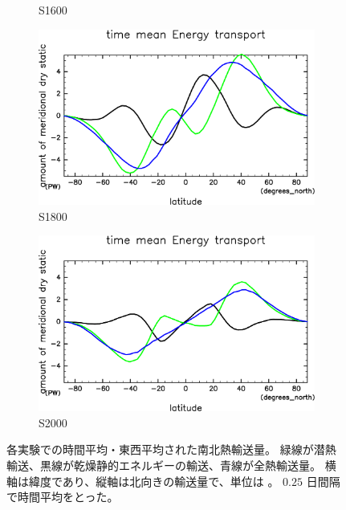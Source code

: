\documentclass[body]{subfiles}
\begin{document}
\begin{figure}[t]
\begin{subfigure}{.4\textwidth}
		\caption{S1600}\label{EnFlxS1600}
	\end{subfigure}
	\begin{subfigure}{.4\textwidth}
		\centering
		\includegraphics[width=\columnwidth]{S1800/EngyFlx,time=3650:4015-crop-rotate.pdf}
		\caption{S1800}\label{EnFlxS1800}
	\end{subfigure}
	\begin{subfigure}{.4\textwidth}
		\centering
		\includegraphics[width=\columnwidth]{S2000/EngyFlx,time=7300:7665-crop-rotate.pdf}
		\caption{S2000}\label{EnFlxS2000}
	\end{subfigure}
	\caption[各実験での南北熱輸送量]{
		各実験での時間平均・東西平均された南北熱輸送量。
		緑線が潜熱輸送、黒線が乾燥静的エネルギーの輸送、青線が全熱輸送量。
		横軸は緯度であり、縦軸は北向きの輸送量で、単位は 。
		\(0.25\) 日間隔で時間平均をとった。
	}\label{EnFlx}
\end{figure}
\end{document}

